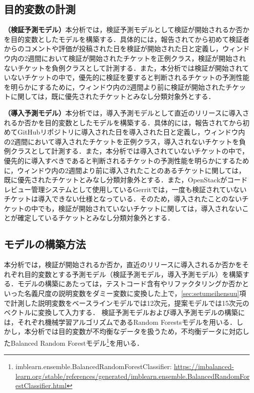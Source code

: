 \documentclass[11pt]{jreport}
\begin{document}
\subsection{目的変数の計測}
\textbf{（検証予測モデル）}本分析では，検証予測モデルとして検証が開始されるか否かを目的変数としたモデルを構築する．具体的には，報告されてから初めて検証者からのコメントや評価が投稿された日を検証が開始された日と定義し，ウィンドウ内の2週間において検証が開始されたチケットを正例クラス，検証が開始されないチケットを負例クラスとして計測する．また，本分析では検証が開始されていないチケットの中で，優先的に検証を要すると判断されるチケットの予測性能を明らかにするために，ウィンドウ内の2週間より前に検証が開始されたチケットに関しては，既に優先されたチケットとみなし分類対象外とする．

\textbf{（導入予測モデル）}本分析では，導入予測モデルとして直近のリリースに導入されるか否かを目的変数としたモデルを構築する．具体的には，報告されてから初めてGitHubリポジトリに導入された日を導入された日と定義し，ウィンドウ内の2週間において導入されたチケットを正例クラス，導入されないチケットを負例クラスとして計測する．また，本分析では導入されていないチケットの中で，優先的に導入すべきであると判断されるチケットの予測性能を明らかにするために，ウィンドウ内の2週間より前に導入されたことのあるチケットに関しては，既に優先されたチケットとみなし分類対象外とする．また，OpenStackがコードレビュー管理システムとして使用しているGerritでは，一度も検証されていないチケットは導入できない仕様となっている．そのため，導入されたことのないチケットの中でも，検証が開始されていないチケットに関しては，導入されないことが確定しているチケットとみなし分類対象外とする．

\subsection{モデルの構築方法}
本分析では，検証が開始されるか否か，直近のリリースに導入されるか否かをそれぞれ目的変数とする予測モデル（検証予測モデル，導入予測モデル）を構築する．モデルの構築にあたっては，テストコード含有やリファクタリングか否かといった名義尺度の説明変数をダミー変数に変換した上で，\ref{sec:setumeihensuu}項で計測した説明変数をベースラインモデルでは12次元，提案モデルでは15次元のベクトルに変換して入力する．
検証予測モデルおよび導入予測モデルの構築には，それぞれ機械学習アルゴリズムであるRandom Forestsモデル\cite{randomforest}を用いる．しかし，本分析では目的変数が不均衡なデータを扱うため，不均衡データに対応したBalanced Random Forestモデル\footnote{imblearn.ensemble.BalancedRandomForestClassifier: \url{https://imbalanced-learn.org/stable/references/generated/imblearn.ensemble.BalancedRandomForestClassifier.html}}を用いる．
\end{document}
